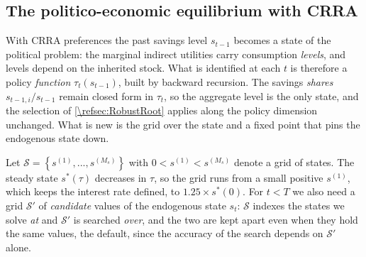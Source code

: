 \subsection{The politico-economic equilibrium with CRRA}\label{\refsec:PEE}
With CRRA preferences the past savings level $s_{t-1}$ becomes a state of the political problem: the marginal indirect utilities carry consumption \emph{levels}, and levels depend on the inherited stock. What is identified at each $t$ is therefore a policy \emph{function} $\tau_t(s_{t-1})$, built by backward recursion. The savings \emph{shares} $s_{t-1,i}/s_{t-1}$ remain closed form in $\tau_t$, so the aggregate level is the only state, and the selection of \cref{\refsec:RobustRoot} applies along the policy dimension unchanged. What is new is the grid over the state and a fixed point that pins the endogenous state down.

 Let $\mathcal{S} = \left\lbrace s^{(1)}, ..., s^{(M_s)} \right\rbrace$ with $0<s^{(1)}<s^{(M_s)}$ denote a grid of states. The steady state $s^*(\tau)$ decreases in $\tau$, so the grid runs from a small positive $s^{(1)}$, which keeps the interest rate defined, to $1.25\times s^*(0)$. For $t<T$ we also need a grid $\mathcal{S}'$ of \emph{candidate} values of the endogenous state $s_t$: $\mathcal{S}$ indexes the states we solve \emph{at} and $\mathcal{S}'$ is searched \emph{over}, and the two are kept apart even when they hold the same values, the default, since the accuracy of the search depends on $\mathcal{S}'$ alone.

